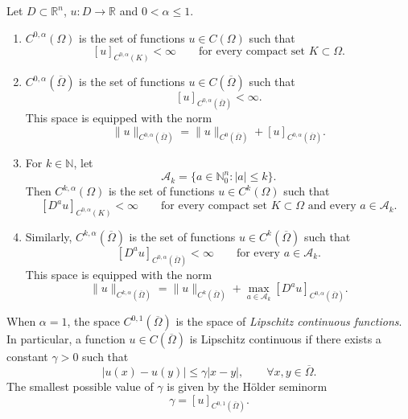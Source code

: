 \begin{definition}
    Let $D\subset\mathbb{R}^n$, $u:D\rightarrow\mathbb{R}$ and
    $0<\alpha\leq1$.
    \begin{enumerate}
        \item[(i)] $C^{0,\alpha}(\Omega)$ is the set of functions
        $u\in C(\Omega)$ such that
        \[
            [u]_{C^{0,\alpha}(K)}<\infty
            \qquad
            \text{for every compact set }K\subset\Omega.
        \]
        \item[(ii)] $C^{0,\alpha}(\overline{\Omega})$ is the set of
        functions $u\in C(\overline{\Omega})$ such that
        \[
            [u]_{C^{0,\alpha}(\overline{\Omega})}<\infty.
        \]
        This space is equipped with the norm
        \[
            \|u\|_{C^{0,\alpha}(\overline{\Omega})}
            =
            \|u\|_{C^0(\overline{\Omega})}
            +
            [u]_{C^{0,\alpha}(\overline{\Omega})}.
        \]
        \item[(iii)] For $k\in\mathbb{N}$, let
        \[
            \mathcal{A}_k
            =
            \{a\in\mathbb{N}_0^n:|a|\leq k\}.
        \]
        Then $C^{k,\alpha}(\Omega)$ is the set of functions
        $u\in C^k(\Omega)$ such that
        \[
            [D^a u]_{C^{0,\alpha}(K)}<\infty
            \qquad
            \text{for every compact set }K\subset\Omega
            \text{ and every }a\in\mathcal{A}_k.
        \]
        \item[(iv)] Similarly,
        $C^{k,\alpha}(\overline{\Omega})$ is the set of functions
        $u\in C^k(\overline{\Omega})$ such that
        \[
            [D^a u]_{C^{0,\alpha}(\overline{\Omega})}<\infty
            \qquad
            \text{for every }a\in\mathcal{A}_k.
        \]
        This space is equipped with the norm
        \[
            \|u\|_{C^{k,\alpha}(\overline{\Omega})}
            =
            \|u\|_{C^k(\overline{\Omega})}
            +
            \max_{a\in\mathcal{A}_k}
            [D^a u]_{C^{0,\alpha}(\overline{\Omega})}.
        \]
    \end{enumerate}
\end{definition}

\begin{remark}
    \label{rem:Lipschitz}
    When $\alpha=1$, the space $C^{0,1}(\overline{\Omega})$ is the space
    of \textit{Lipschitz continuous functions}. In particular, a function
    $u\in C(\overline{\Omega})$ is Lipschitz continuous if there exists a
    constant $\gamma>0$ such that
    \[
        |u(x)-u(y)|
        \leq \gamma |x-y|,
        \qquad
        \forall x,y\in\overline{\Omega}.
    \]
    The smallest possible value of $\gamma$ is given by the H\"older
    seminorm
    \[
        \gamma=[u]_{C^{0,1}(\overline{\Omega})}.
    \]
\end{remark}

